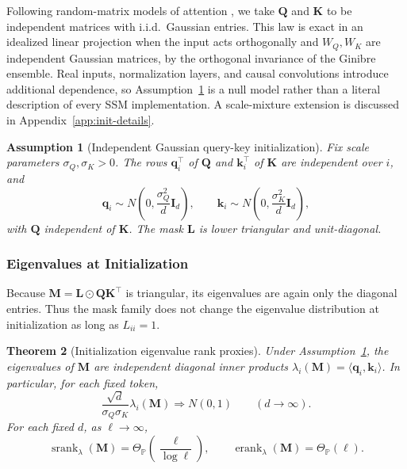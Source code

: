 \documentclass{article}
\newcommand{\Prob}{\mathbb{P}}
\newcommand{\srank}{\operatorname{srank}}
\newcommand{\erank}{\operatorname{erank}}
\newcommand{\weak}{\Rightarrow}
\newcommand{\hadamard}{\mathbin{\odot}}
\newcommand{\bM}{\mathbf{M}}
\newcommand{\bL}{\mathbf{L}}
\newcommand{\bQ}{\mathbf{Q}}
\newcommand{\bK}{\mathbf{K}}
\newtheorem{theorem}{Theorem}
\newtheorem{assumption}[theorem]{Assumption}
\theoremstyle{definition}
\theoremstyle{remark}
\begin{document}
Following random-matrix models of attention
\citep{mindthegap_width,hayase2026gaussian}, we take $\bQ$ and $\bK$ to be
independent matrices with i.i.d.\ Gaussian entries.  This law is exact in an
idealized linear projection when the input acts orthogonally and $W_Q,W_K$ are
independent Gaussian matrices, by the orthogonal invariance of the Ginibre
ensemble.  Real inputs, normalization layers, and causal convolutions introduce
additional dependence, so Assumption~\ref{ass:gaussian-init} is a null model
rather than a literal description of every SSM implementation.  A scale-mixture
extension is discussed in Appendix~\ref{app:init-details}.

\begin{assumption}[Independent Gaussian query-key initialization]
Fix scale parameters $\sigma_Q,\sigma_K>0$.
The rows $\mathbf q_i^\top$ of $\bQ$ and $\mathbf k_i^\top$ of $\bK$ are
independent over $i$, and
\[
    \mathbf q_i\sim N\left(0,\frac{\sigma_Q^2}{d}\mathbf I_d\right),
    \qquad
    \mathbf k_i\sim N\left(0,\frac{\sigma_K^2}{d}\mathbf I_d\right),
\]
with $\bQ$ independent of $\bK$.  The mask $\bL$ is lower triangular and
unit-diagonal.
\label{ass:gaussian-init}
\end{assumption}

\subsubsection{Eigenvalues at Initialization}


Because $\bM=\bL\hadamard\bQ\bK^\top$ is triangular, its eigenvalues are again
only the diagonal entries.  Thus the mask family does not change the
eigenvalue distribution at initialization as long as $L_{ii}=1$.

\begin{theorem}[Initialization eigenvalue rank proxies]
Under Assumption~\ref{ass:gaussian-init}, the eigenvalues of $\bM$ are
independent diagonal inner products
$\lambda_i(\bM)=\langle\mathbf q_i,\mathbf k_i\rangle$.  In particular, for
each fixed token,
\begin{equation}
    \frac{\sqrt d}{\sigma_Q\sigma_K}\lambda_i(\bM)
    \weak N(0,1)
    \qquad (d\to\infty).
    \label{eq:init-eigenvalue-gaussian-limit}
\end{equation}
For each fixed $d$, as $\ell\to\infty$,
\begin{equation}
    \srank_\lambda(\bM)=\Theta_{\Prob}\left(\frac{\ell}{\log\ell}\right),
    \qquad
    \erank_\lambda(\bM)
    =
    \Theta_{\Prob}(\ell).
    \label{eq:init-fixed-d-ranks}
\end{equation}
\label{thm:init-eigenvalue-proxies}
\end{theorem}
\end{document}
